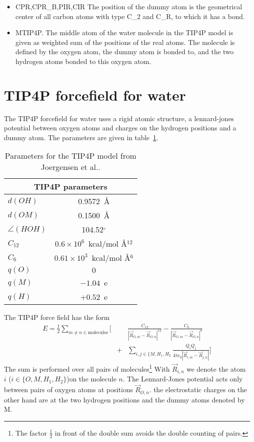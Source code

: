 \documentclass[11pt,a4paper]{report}
\begin{document}
\begin{itemize}
\item CPR,CPR\_B,PIR,CIR The position of the dummy atom is the
  geometrical center of all carbon atoms with type C\_2 and C\_R, to
  which it has a bond.
%
\item MTIP4P. The middle atom of the water molecule in the TIP4P model
  is given as weighted sum of the positions of the real atoms. The
  molecule is defined by the oxygen atom, the dummy atom is bonded to,
  and the two hydrogen atoms bonded to this oxygen atom.
\end{itemize}


\section{TIP4P forcefield for water}
The TIP4P forcefield\cite{jorgensen83_jcp79_926} for water uses a
rigid atomic structure, a lennard-jones potential between oxygen atoms
and charges on the hydrogen positions and a dummy atom. The parameters
are given in table~\ref{tab:tip4ppar}.

\begin{table}[htb!]
\begin{center}
\begin{tabular}{|l|c|}
\hline
\hline
\multicolumn{2}{|c|}{TIP4P parameters}\\
\hline
$d(OH)$ & 0.9572~\AA\\
$d(OM)$ & 0.1500~\AA\\
$\angle(HOH)$ & 104.52$^\circ$\\
$C_{12}$ & $0.6\times 10^6$~kcal/mol \AA$^{12}$\\
$C_{6}$ & $0.61\times 10^3$~kcal/mol \AA$^{6}$\\
$q(O)$ & $0$\\
$q(M)$ & $-1.04$~e \\
$q(H)$ & $+0.52$~e \\
\hline
\hline
\end{tabular}
\end{center}
\caption{\label{tab:tip4ppar} Parameters for the TIP4P model from
    Joergensen et al.\cite{jorgensen83_jcp79_926}.}
\end{table}

The TIP4P force field has the form
\begin{eqnarray}
E=\frac{1}{2}\sum_{m\neq n\in\text{molecules}} 
\biggl[&&
\frac{C_{12}}{|\vec{R}_{O,m}-\vec{R}_{O,n}|^{12}}
-\frac{C_{6}}{|\vec{R}_{O,m}-\vec{R}_{O,n}|^{6}}
\nonumber\\
&+&\sum_{i,j\in\{M,H_1,H_2}\frac{Q_iQ_j}
{4\pi\epsilon_0|\vec{R}_{i,m}-\vec{R}_{j,n}|}
\biggr]
\end{eqnarray}
The sum is performed over all pairs of molecules\footnote{The factor
  $\frac{1}{2}$ in front of the double sum avoids the double counting
  of pairs.}  With $\vec{R}_{i,n}$ we denote the atom $i$
($i\in\{O,M,H_1,H_2\}$)on the molecule $n$.  The Lennard-Jones
potential acts only between pairs of oxygen atoms at positions
$\vec{R}_{O,n}$. the electrostatic charges on the other hand are at
the two hydrogen positions and the dummy atoms denoted by M.
\end{document}
